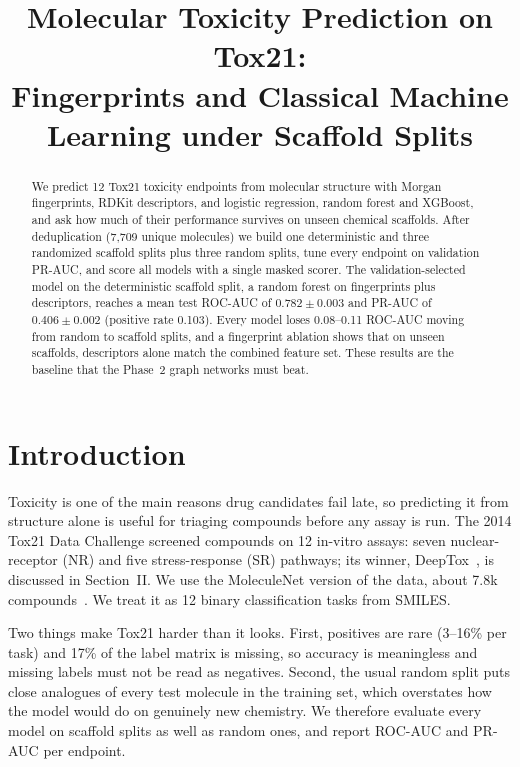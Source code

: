 \documentclass[conference]{IEEEtran}
\begin{document}
\title{Molecular Toxicity Prediction on Tox21:\\Fingerprints and Classical Machine Learning under Scaffold Splits}

\author{
}

\maketitle

\begin{abstract}
We predict 12 Tox21 toxicity endpoints from molecular structure with Morgan fingerprints, RDKit descriptors, and logistic regression, random forest and XGBoost, and ask how much of their performance survives on unseen chemical scaffolds. After deduplication (7{,}709 unique molecules) we build one deterministic and three randomized scaffold splits plus three random splits, tune every endpoint on validation PR-AUC, and score all models with a single masked scorer. The validation-selected model on the deterministic scaffold split, a random forest on fingerprints plus descriptors, reaches a mean test ROC-AUC of $0.782\pm0.003$ and PR-AUC of $0.406\pm0.002$ (positive rate 0.103). Every model loses 0.08--0.11 ROC-AUC moving from random to scaffold splits, and a fingerprint ablation shows that on unseen scaffolds, descriptors alone match the combined feature set. These results are the baseline that the Phase~2 graph networks must beat.
\end{abstract}

\section{Introduction}
Toxicity is one of the main reasons drug candidates fail late, so predicting it from structure alone is useful for triaging compounds before any assay is run. The 2014 Tox21 Data Challenge screened compounds on 12 in-vitro assays: seven nuclear-receptor (NR) and five stress-response (SR) pathways; its winner, DeepTox~\cite{mayr2016deeptox}, is discussed in Section~II. We use the MoleculeNet version of the data, about 7.8k compounds~\cite{wu2018moleculenet}. We treat it as 12 binary classification tasks from SMILES.

Two things make Tox21 harder than it looks. First, positives are rare (3--16\% per task) and 17\% of the label matrix is missing, so accuracy is meaningless and missing labels must not be read as negatives. Second, the usual random split puts close analogues of every test molecule in the training set, which overstates how the model would do on genuinely new chemistry. We therefore evaluate every model on scaffold splits as well as random ones, and report ROC-AUC and PR-AUC per endpoint.
\end{document}
